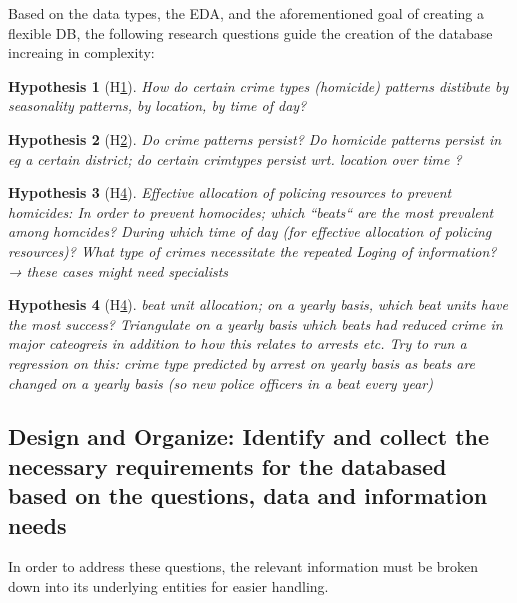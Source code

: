 \documentclass[a4paper]{article}
\newtheorem{hyp}{Hypothesis}
\begin{document}
Based on the data types, the EDA, and the aforementioned goal of creating a flexible DB, the following research questions guide the creation of the database increaing in complexity:


\begin{hyp}[H\ref{hyp:first}] \label{hyp:first}
How do certain crime types (homicide) patterns distibute by seasonality patterns, by location, by time of day?
\end{hyp}

\begin{hyp}[H\ref{hyp:second}] \label{hyp:second}
Do crime patterns persist? Do homicide patterns persist in eg a certain district; do certain crimtypes persist wrt. location over time ?
\end{hyp}

\begin{hyp}[H\ref{hyp:third}] \label{hyp:third}
Effective allocation of policing resources to prevent homicides:
In order to prevent homocides; which “beats“ are the most prevalent among homcides? During which time of day (for effective allocation of policing resources)? 
 What type of crimes necessitate the repeated Loging of information? → these cases might need specialists
\end{hyp}

\begin{hyp}[H\ref{hyp:third}] \label{hyp:third}
beat unit allocation; on a yearly basis, which beat units have the most success? Triangulate on a yearly basis which beats had reduced crime in major cateogreis in addition to how this relates to arrests etc. Try to run a regression on this: crime type predicted by arrest on yearly basis as beats are changed on a yearly basis (so new police officers in a beat every year)
\end{hyp}


\subsection{Design and Organize: Identify and collect the necessary requirements for the databased based on the questions, data and information needs}
In order to address these questions, the relevant information must be broken down into its underlying entities for easier handling. 
\end{document}
